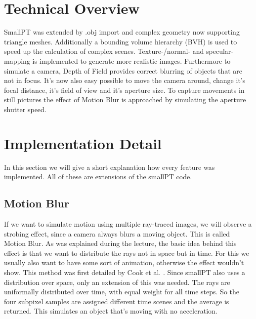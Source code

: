 \documentclass[11pt,a4paper]{article}
\begin{document}
\section{Technical Overview}
SmallPT was extended by .obj import and complex geometry now supporting triangle meshes. Additionally a bounding volume hierarchy (BVH) is used to speed up the calculation of complex scenes. Texture-/normal- and specular-mapping is implemented to generate more realistic images. Furthermore to simulate a camera, Depth of Field provides correct blurring of objects that are not in focus. It's now also easy possible to move the camera around, change it's focal distance, it's field of view and it's aperture size. To capture movements in still pictures the effect of Motion Blur is approached by simulating the aperture shutter speed.

\section{Implementation Detail}
In this section we will give a short explanation how every feature was implemented. All of these are extensions of the smallPT code. 

\subsection{Motion Blur}
If we want to simulate motion using multiple ray-traced images, we will observe a strobing effect, since a camera always blurs a moving object. This is called Motion Blur.
As was explained during the lecture, the basic idea behind this effect is that we want to distribute the rays not in space but in time. For this we usually also want to have some sort of animation, otherwise the effect wouldn't show. This method was first detailed by Cook et al. \cite{Cook:1984}.
Since smallPT also uses a distribution over space, only an extension of this was needed.
The rays are uniformally distributed over time, with equal weight for all time steps. So the four subpixel samples are assigned different time scenes and the average is returned.
This simulates an object that's moving with no acceleration. 
\end{document}
